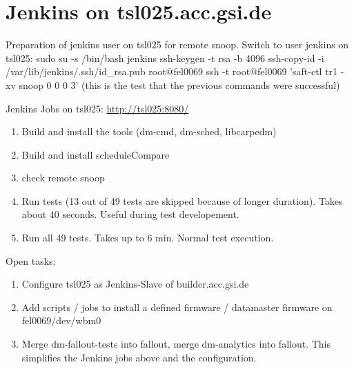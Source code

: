 \documentclass[12pt,a4paper]{report}
\begin{document}
\section{Jenkins on tsl025.acc.gsi.de}
Preparation of jenkins user on tsl025 for remote snoop.
\linebreak Switch to user jenkins on tsl025:
\linebreak sudo su -s /bin/bash jenkins
\linebreak ssh-keygen -t rsa -b 4096
\linebreak ssh-copy-id -i /var/lib/jenkins/.ssh/id\_rsa.pub root@fel0069
\linebreak ssh -t root@fel0069 'saft-ctl tr1 -xv snoop 0 0 0 3' (this is the test that the previous commands were successful)

Jenkins Jobs on tsl025: \url{http://tsl025:8080/}
\begin{enumerate}
\item Build and install the tools (dm-cmd, dm-sched, libcarpedm)
\item Build and install scheduleCompare
\item check remote snoop
\item Run tests (13 out of 49 tests are skipped because of longer duration). Takes about 40 seconds. Useful during test developement.
\item Run all 49 tests. Takes up to 6 min. Normal test execution.
\end{enumerate}

Open tasks:
\begin{enumerate}
\item Configure tsl025 as Jenkins-Slave of builder.acc.gsi.de
\item Add scripts / jobs to install a defined firmware / datamaster firmware on fel0069/dev/wbm0
\item Merge dm-fallout-tests into fallout, merge dm-analytics into fallout. This simplifies the Jenkins jobs above and the configuration.
\end{enumerate}
\end{document}
